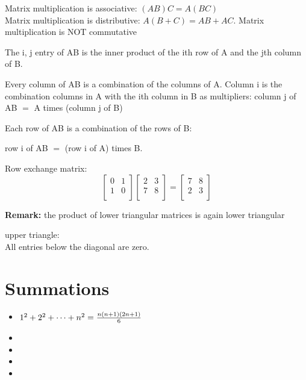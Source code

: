\documentclass[12pt]{article}
\newcommand{\rmk}[1]{\par {\bf Remark: }{#1}}
\begin{document}
\begin{theorem}
  Matrix multiplication is associative: $(AB)C = A(BC)$\\
  Matrix multiplication is distributive: $A(B + C) = AB + AC$.
  Matrix multiplication is NOT commutative
\end{theorem}
\begin{theorem}
  The i, j entry of AB is the inner product of the ith row of A and
  the jth column of B.
  
  Every column of AB is a combination of the columns of A. Column i is
  the combination columns in A with the ith column in B as
  multipliers: column j of AB $=$ A times (column j of B)
  
  Each row of AB is a combination of the rows of B: 

  row i of AB $=$ (row i of A) times B.
\end{theorem}
\begin{definition}Row exchange matrix:\\
  $$\begin{bmatrix}
  0 & 1\\
  1 & 0\\
  \end{bmatrix}
  \begin{bmatrix}
  2 & 3\\
  7 & 8\\
  \end{bmatrix}
  = 
  \begin{bmatrix}
  7 & 8\\
  2 & 3\\
  \end{bmatrix}
  $$

\end{definition}
\rmk{the product of lower triangular matrices is again lower
  triangular}
\begin{definition}upper triangle: \\

  All entries below the diagonal are zero.
\end{definition}
\section{Summations}
\begin{itemize}
\item $1^2 + 2^2 + \dots + n^2 = {n(n + 1)(2n + 1) \over 6}$
\item 
\item 
\item 
\item 
\end{itemize}

\pagebreak

\end{document}
